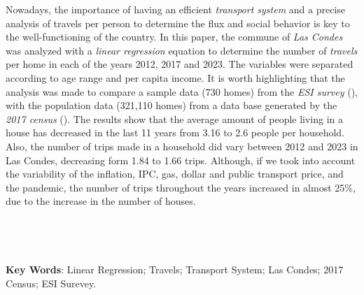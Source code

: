 \documentclass[12pt]{article} %
\begin{document}
\begin{titlepage}
\begin{justify}
    Nowadays, the importance of having an efficient \textit{transport 
    system} and a precise analysis of travels per person to 
    determine the flux and social behavior is key to the 
    well-functioning of the country.  In this paper, the commune 
    of \textit{Las Condes} was analyzed with a \textit{linear regression} equation to 
    determine the number of \textit{travels} per home in each of the years 2012, 
    2017 and 2023. The variables were separated according to age range 
    and per capita income. It is worth highlighting that the analysis 
    was made to compare a sample data (730 homes) from the \textit{ESI survey} (\textbf{\cite{esi}}), with the population data (321,110 homes)
    from a data base generated by the \textit{2017 census} (\textbf{\cite{censo2017}}). 
    The results show that the average amount of people living in a house has decreased 
    in the last 11 years from 3.16 to 2.6 people per household. Also, the number of trips 
    made in a household did vary between 2012 and 2023 in Las Condes, decreasing form 
    1.84 to 1.66 trips. Although, if we took into account the variability of the inflation, IPC, gas, dollar and public transport price, 
    and the pandemic, the number of trips throughout the years increased in almost 25\%, due to the increase in the number of houses. 
    \\ \\ \\ \\ \\
    \textbf{Key Words}: Linear Regression; Travels; Transport System; Las Condes; 2017 Census; ESI Surevey.
\end{justify}


\vspace{1cm}

\end{titlepage}

\end{document}
